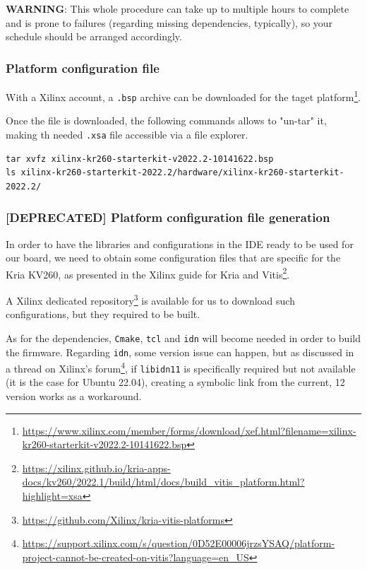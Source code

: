 \documentclass[10pt]{article}
\begin{document}
\begin{tcolorbox}[colback=orange!5!white,colframe=orange!75!black]
\textbf{WARNING}: This whole procedure can take up to multiple hours to complete
and is prone to failures (regarding missing dependencies, typically),
so your schedule should be arranged accordingly.
\end{tcolorbox}

\subsubsection{Platform configuration file}
\label{sec:orgaca610f}
With a Xilinx account, a \texttt{.bsp} archive can be downloaded for the taget platform\footnote{\url{https://www.xilinx.com/member/forms/download/xef.html?filename=xilinx-kr260-starterkit-v2022.2-10141622.bsp}}.

Once the file is downloaded, the following commands allows to "un-tar" it,
making th needed \texttt{.xsa} file accessible via a file explorer.

\begin{verbatim}
tar xvfz xilinx-kr260-starterkit-v2022.2-10141622.bsp
ls xilinx-kr260-starterkit-2022.2/hardware/xilinx-kr260-starterkit-2022.2/
\end{verbatim}


\subsubsection{[DEPRECATED] Platform configuration file generation}
\label{sec:org9f0d891}
In order to have the libraries and configurations in the IDE ready to be used for our board,
we need to obtain some configuration files that are specific for the Kria KV260,
as presented in the Xilinx guide for Kria and Vitis\footnote{\url{https://xilinx.github.io/kria-apps-docs/kv260/2022.1/build/html/docs/build\_vitis\_platform.html?highlight=xsa}}.

A Xilinx dedicated repository\footnote{\url{https://github.com/Xilinx/kria-vitis-platforms}} is available for us to download  such configurations,
but they required to be built.

As for the dependencies, \texttt{Cmake}, \texttt{tcl} and \texttt{idn} will become needed in order to build the firmware.
Regarding \texttt{idn}, some version issue can happen, but as discussed in a thread on Xilinx's forum\footnote{\url{https://support.xilinx.com/s/question/0D52E00006jrzsYSAQ/platform-project-cannot-be-created-on-vitis?language=en\_US}},
if \texttt{libidn11} is specifically required but not available (it is the case for Ubuntu 22.04),
creating a symbolic link from the current, 12 version works as a workaround.
\end{document}

